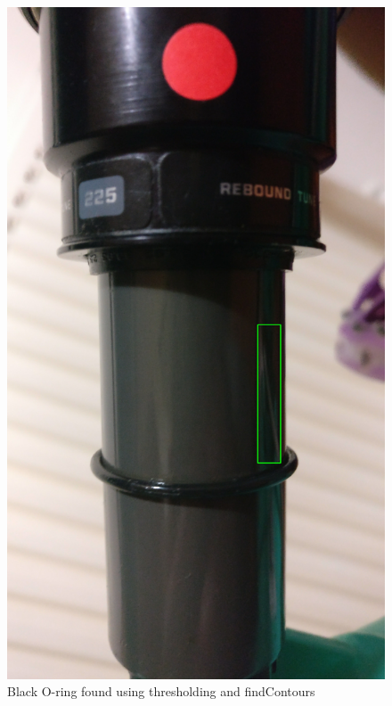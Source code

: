 			\begin{figure}[h!]
				\centering
				\includegraphics[scale=0.1,trim={20cm 40cm 20cm 70cm},clip]{../images/results/fox_oring.jpg}
				\caption{Black O-ring found using thresholding and {\ttfamily findContours}}
				\label{fig:black_oring}
			\end{figure}
